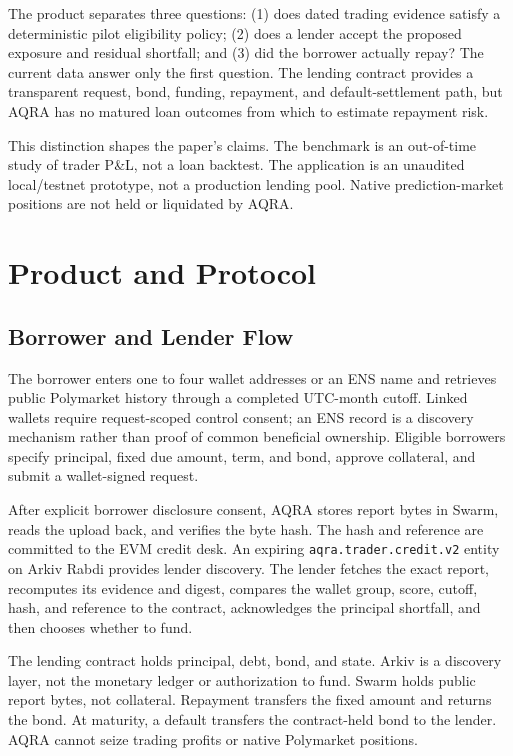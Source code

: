 \documentclass[conference]{IEEEtran}
\begin{document}
The product separates three questions: (1) does dated trading evidence satisfy a deterministic pilot eligibility policy; (2) does a lender accept the proposed exposure and residual shortfall; and (3) did the borrower actually repay? The current data answer only the first question. The lending contract provides a transparent request, bond, funding, repayment, and default-settlement path, but AQRA has no matured loan outcomes from which to estimate repayment risk.

This distinction shapes the paper's claims. The benchmark is an out-of-time study of trader P\&L, not a loan backtest. The application is an unaudited local/testnet prototype, not a production lending pool. Native prediction-market positions are not held or liquidated by AQRA.

\section{Product and Protocol}
\subsection{Borrower and Lender Flow}
The borrower enters one to four wallet addresses or an ENS name and retrieves public Polymarket history through a completed UTC-month cutoff. Linked wallets require request-scoped control consent; an ENS record is a discovery mechanism rather than proof of common beneficial ownership. Eligible borrowers specify principal, fixed due amount, term, and bond, approve collateral, and submit a wallet-signed request.

After explicit borrower disclosure consent, AQRA stores report bytes in Swarm, reads the upload back, and verifies the byte hash. The hash and reference are committed to the EVM credit desk. An expiring \texttt{aqra.trader.credit.v2} entity on Arkiv Rabdi provides lender discovery. The lender fetches the exact report, recomputes its evidence and digest, compares the wallet group, score, cutoff, hash, and reference to the contract, acknowledges the principal shortfall, and then chooses whether to fund.

The lending contract holds principal, debt, bond, and state. Arkiv is a discovery layer, not the monetary ledger or authorization to fund. Swarm holds public report bytes, not collateral. Repayment transfers the fixed amount and returns the bond. At maturity, a default transfers the contract-held bond to the lender. AQRA cannot seize trading profits or native Polymarket positions.
\end{document}

